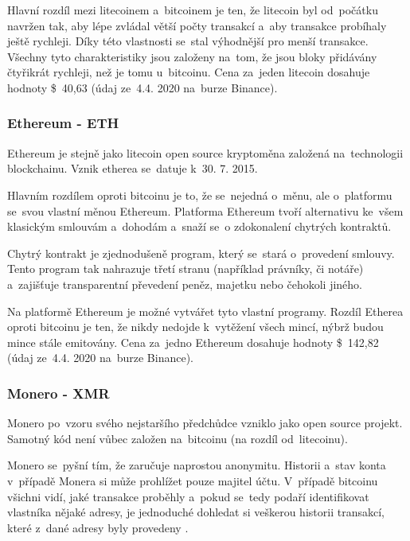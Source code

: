 \documentclass[thesis=B,czech]{FITthesis}[2019/03/21]
\begin{document}
Hlavní rozdíl mezi litecoinem a~bitcoinem je ten, že litecoin byl od~počátku navržen tak, aby lépe zvládal větší počty transakcí a~aby transakce probíhaly ještě rychleji. Díky této vlastnosti se~stal výhodnější pro menší transakce. Všechny tyto charakteristiky jsou založeny na~tom, že jsou bloky přidávány čtyřikrát rychleji, než je tomu u~bitcoinu. \cite{litecoin} Cena za~jeden litecoin dosahuje hodnoty \$~40,63 (údaj ze~4.4. 2020 na~burze Binance). \cite{binance_markets}

\subsubsection{Ethereum - ETH}
Ethereum je stejně jako litecoin open source kryptoměna založená na~technologii blockchainu. Vznik etherea se~datuje k~30. 7. 2015. 

Hlavním rozdílem oproti bitcoinu je to, že se~nejedná o~měnu, ale o~platformu se~svou vlastní měnou Ethereum. Platforma Ethereum tvoří alternativu ke~všem klasickým smlouvám a~dohodám a~snaží se~o zdokonalení chytrých kontraktů. \cite{btc_vs_eth}

Chytrý kontrakt je zjednodušeně program, který se~stará o~provedení smlouvy. Tento program tak nahrazuje třetí stranu (například právníky, či notáře) a~zajišťuje transparentní převedení peněz, majetku nebo čehokoli \linebreak jiného. \cite{ethereum}

Na platformě Ethereum je možné vytvářet tyto vlastní programy. \cite{ethereum} Rozdíl Etherea oproti bitcoinu je ten, že nikdy nedojde k~vytěžení všech mincí, nýbrž budou mince stále emitovány. \cite{alza_monero} Cena za~jedno Ethereum dosahuje hodnoty  \$~142,82 (údaj ze~4.4. 2020 na~burze Binance). \cite{binance_markets}

\subsubsection{Monero - XMR}
Monero po~vzoru svého nejstaršího předchůdce vzniklo jako open source projekt. Samotný kód není vůbec založen na~bitcoinu (na rozdíl od~litecoinu). 

Monero se~pyšní tím, že zaručuje naprostou anonymitu. Historii a~stav konta v~případě Monera si může prohlížet pouze majitel účtu. V~případě bitcoinu všichni vidí, jaké transakce proběhly a~pokud se~tedy podaří identifikovat vlastníka nějaké adresy, je jednoduché dohledat si veškerou historii transakcí, které z~dané adresy byly provedeny .
\end{document}
